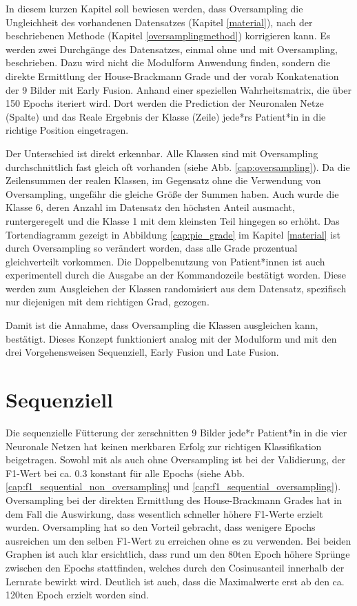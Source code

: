 In diesem kurzen Kapitel soll bewiesen werden, dass Oversampling die Ungleichheit des vorhandenen Datensatzes (Kapitel \ref{material}), nach der beschriebenen Methode (Kapitel \ref{oversamplingmethod}) korrigieren kann. Es werden zwei Durchgänge des Datensatzes, einmal ohne und mit Oversampling, beschrieben. Dazu wird nicht die Modulform Anwendung finden, sondern die direkte Ermittlung der House-Brackmann Grade und der vorab Konkatenation der 9 Bilder mit Early Fusion. Anhand einer speziellen Wahrheitsmatrix, die über 150 Epochs iteriert wird. Dort werden die Prediction der Neuronalen Netze (Spalte) und das Reale Ergebnis der Klasse (Zeile) jede*rs Patient*in in die richtige Position eingetragen.

Der Unterschied ist direkt erkennbar. Alle Klassen sind mit Oversampling durchschnittlich fast gleich oft vorhanden (siehe Abb. \ref{cap:oversampling}). Da die Zeilensummen der realen Klassen, im Gegensatz ohne die Verwendung von Oversampling, ungefähr die gleiche Größe der Summen haben. Auch wurde die Klasse 6, deren Anzahl im Datensatz den höchsten Anteil ausmacht, runtergeregelt und die Klasse 1 mit dem kleinsten Teil hingegen so erhöht. Das Tortendiagramm gezeigt in Abbildung \ref{cap:pie_grade} im Kapitel \ref{material} ist durch Oversampling so verändert worden, dass alle Grade prozentual gleichverteilt vorkommen. Die Doppelbenutzung von Patient*innen ist auch experimentell durch die Ausgabe an der Kommandozeile bestätigt worden. Diese werden zum Ausgleichen der Klassen randomisiert aus dem Datensatz, spezifisch nur diejenigen mit dem richtigen Grad, gezogen.

Damit ist die Annahme, dass Oversampling die Klassen ausgleichen kann, bestätigt. Dieses Konzept funktioniert analog mit der Modulform und mit den drei Vorgehensweisen Sequenziell, Early Fusion und Late Fusion.




\clearpage
\section{Sequenziell}\label{sequent}
Die sequenzielle Fütterung der zerschnitten 9 Bilder jede*r Patient*in in die vier Neuronale Netzen hat keinen merkbaren Erfolg zur richtigen Klassifikation beigetragen. Sowohl mit als auch ohne Oversampling ist bei der Validierung, der F1-Wert bei ca. 0.3 konstant für alle Epochs (siehe Abb. \ref{cap:f1_sequential_non_oversampling} und \ref{cap:f1_sequential_oversampling}). Oversampling bei der direkten Ermittlung des House-Brackmann Grades hat in dem Fall die Auswirkung, dass wesentlich schneller höhere F1-Werte erzielt wurden. Oversampling hat so den Vorteil gebracht, dass wenigere Epochs ausreichen um den selben F1-Wert zu erreichen ohne es zu verwenden. Bei beiden Graphen ist auch klar ersichtlich, dass rund um den 80ten Epoch höhere Sprünge zwischen den Epochs stattfinden, welches durch den Cosinusanteil innerhalb der Lernrate bewirkt wird. Deutlich ist auch, dass die Maximalwerte erst ab den ca. 120ten Epoch erzielt worden sind.

